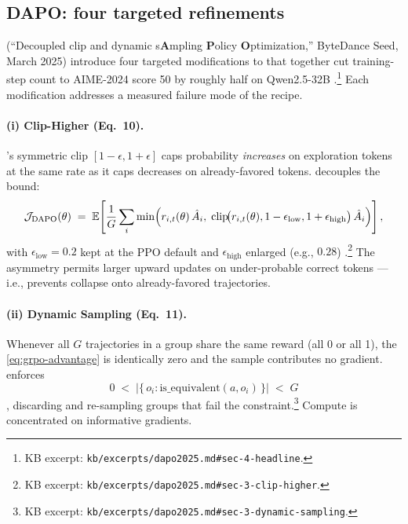 \subsection{DAPO: four targeted refinements}
\label{sec:rlvr-dapo}

\citet{dapo2025} (``Decoupled clip and dynamic s\textbf{A}mpling
\textbf{P}olicy \textbf{O}ptimization,'' ByteDance Seed, March 2025)
introduce four targeted modifications to  that together cut
training-step count to AIME-2024 score 50 by roughly half on
Qwen2.5-32B \citep[\S 4]{dapo2025}.\footnote{KB excerpt:
\texttt{kb/excerpts/dapo2025.md\#sec-4-headline}.} Each modification
addresses a measured failure mode of the  recipe.

\paragraph{(i) Clip-Higher (Eq.\ 10).} 's symmetric clip
$[1 - \epsilon, 1 + \epsilon]$ caps probability \emph{increases} on
exploration tokens at the same rate as it caps decreases on
already-favored tokens.  decouples the bound:
\begin{equation}
\mathcal{J}_{\mathrm{DAPO}}(\theta) \;=\; \operatorname{\mathbb{E}}\!\left[\frac{1}{G} \sum_i \min\!\Big( r_{i,t}(\theta)\, \hat{A}_i,\; \mathrm{clip}\!\big(r_{i,t}(\theta), 1 - \epsilon_{\mathrm{low}}, 1 + \epsilon_{\mathrm{high}}\big)\, \hat{A}_i \Big) \right],
\label{eq:dapo-clip}
\end{equation}
with $\epsilon_{\mathrm{low}} = 0.2$ kept at the PPO default and
$\epsilon_{\mathrm{high}}$ enlarged (e.g., $0.28$)
\citep[Eq.\ 10]{dapo2025}.\footnote{KB excerpt:
\texttt{kb/excerpts/dapo2025.md\#sec-3-clip-higher}.} The asymmetry
permits larger upward updates on under-probable correct tokens — i.e.,
prevents collapse onto already-favored trajectories.

\paragraph{(ii) Dynamic Sampling (Eq.\ 11).} Whenever all $G$
trajectories in a group share the same reward (all 0 or all 1), the
 \cref{eq:grpo-advantage} is identically zero
and the sample contributes no gradient.  enforces
\begin{equation}
0 \;<\; \big| \{\, o_i : \mathrm{is\_equivalent}(a, o_i) \,\}\big| \;<\; G
\label{eq:dapo-dynsample}
\end{equation}
\citep[Eq.\ 11]{dapo2025}, discarding and re-sampling groups that fail
the constraint.\footnote{KB excerpt:
\texttt{kb/excerpts/dapo2025.md\#sec-3-dynamic-sampling}.} Compute is
concentrated on informative gradients.

